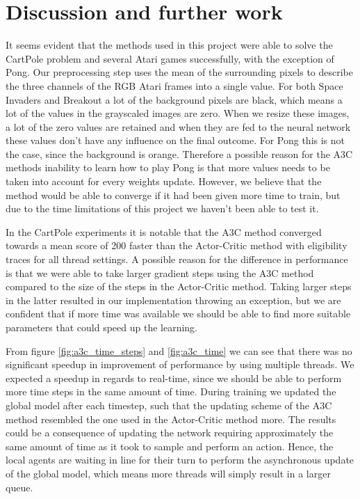 \documentclass[11pt]{article}
\begin{document}
\section{Discussion and further work}

It seems evident that the methods used in this project were able
to solve the CartPole problem and several Atari games successfully,
with the exception of Pong.
Our preprocessing step uses the mean of the surrounding pixels
to describe the three channels of the RGB Atari frames into a single
value.
For both Space Invaders and Breakout a lot of the background pixels are
black, which means a lot of the values in the grayscaled images
are zero.
When we resize these images, a lot of the zero values are retained
and when they are fed to the neural network these values don't have any
influence on the final outcome.
For Pong this is not the case, since the background is orange.
Therefore a possible reason for the A3C methods inability to learn
how to play Pong is that more values needs to be taken into account
for every weights update.
However, we believe that the method would be able to converge if
it had been given more time to train, but due to the time limitations
of this project we haven't been able to test it.

In the CartPole experiments it is notable that the A3C method converged
towards a mean score of 200 faster than the Actor-Critic method with
eligibility traces for all thread settings.
A possible reason for the difference in performance is that we were able to
take larger gradient steps using the A3C method compared to the
size of the steps in the Actor-Critic method.
Taking larger steps in the latter resulted in our implementation
throwing an exception, but we are confident that if more
time was available we should be able to find more suitable parameters
that could speed up the learning.

From figure \ref{fig:a3c_time_steps} and \ref{fig:a3c_time} we can see
that there was no significant speedup in improvement of performance by
using multiple threads.
We expected a speedup in regards to real-time, since we should be able
to perform more time steps in the same amount of time.
During training we updated the global model after each timestep,
such that the updating scheme of the A3C method resembled the one
used in the Actor-Critic method more.
The results could be a consequence of updating the network requiring
approximately the same amount of time as it took to sample and perform
an action.
Hence, the local agents are waiting in line for their turn to
perform the asynchronous update of the global model, which means
more threads will simply result in a larger queue.
\end{document}
